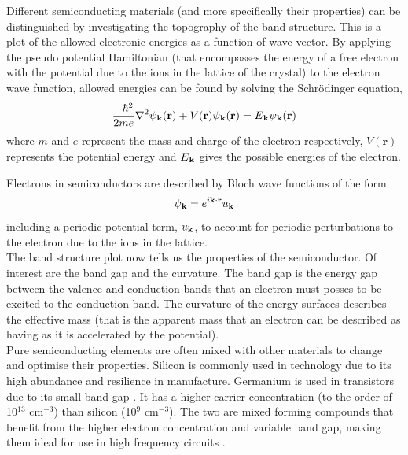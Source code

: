 \documentclass[10pt, twocolumn]{revtex4}    %
\begin{document}
Different semiconducting materials (and more specifically their properties) can be distinguished by investigating the topography of the band structure. This is  a plot of the allowed electronic energies as a function of wave vector. By applying the pseudo potential Hamiltonian (that encompasses the energy of a free electron with the potential due to the ions in the lattice of the crystal) to the electron wave function, allowed energies can be found by solving the Schr\"{o}dinger equation,
\begin{equation}
	\frac{-\hbar^{2}}{2me}\nabla^{2}\psi\textsubscript{\textbf{k}}(\textbf{r}) + 	 V(\textbf{r})\psi\textsubscript{\textbf{k}}(\textbf{r}) = E\textsubscript{\textbf{k}} \psi\textsubscript{\textbf{k}}(\textbf{r})
\end{equation}
where $m$ and $e$ represent the mass and charge of the electron respectively, $V(\textbf{r})$ represents the potential energy and $E\textsubscript{\textbf{k}}$ gives the possible energies of the electron.

Electrons in semiconductors are described by Bloch wave functions of the form
\begin{equation}
	\psi\textsubscript{\textbf{k}} = e^{i \textbf{k$\cdot$r}}u\textsubscript{\textbf{k}}
\end{equation}
including a periodic potential term, $u\textsubscript{\textbf{k}}$, to account for periodic perturbations to the electron due to the ions in the lattice. \\


The band structure plot now tells us the properties of the semiconductor. Of interest are the band gap and the curvature. The band gap is the energy gap between the valence and conduction bands that an electron must posses to be excited to the conduction band.
The curvature of the energy surfaces describes the effective mass (that is the apparent mass that an electron can be described as having as it is accelerated by the potential).\\

Pure semiconducting elements are often mixed with other materials to change and optimise their properties. Silicon is commonly used in technology due to its high abundance and resilience in manufacture. Germanium is used in transistors due to its small band gap \cite{ref02}. It has a higher carrier concentration (to the order of 10$^{13}$ cm$^{-3}$) than silicon (10$^{9}$ cm$^{-3}$).  The two are mixed forming compounds that benefit from the higher electron concentration and variable band gap, making them ideal for use in high frequency circuits \cite{ref03}. \\
\end{document}
